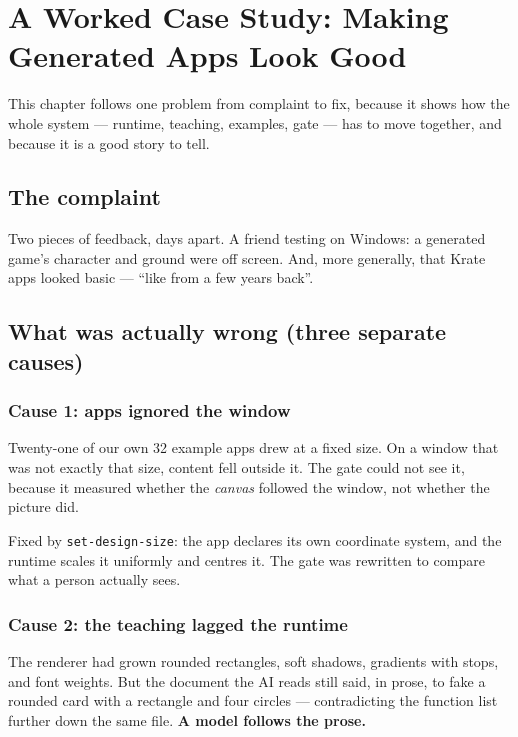\documentclass[11pt,a4paper]{report}
\begin{document}
\chapter{A Worked Case Study: Making Generated Apps Look Good}

This chapter follows one problem from complaint to fix, because it shows
how the whole system --- runtime, teaching, examples, gate --- has to move
together, and because it is a good story to tell.

\section{The complaint}

Two pieces of feedback, days apart. A friend testing on Windows: a
generated game's character and ground were off screen. And, more generally,
that Krate apps looked basic --- ``like from a few years back''.

\section{What was actually wrong (three separate causes)}

\subsection{Cause 1: apps ignored the window}

Twenty-one of our own 32 example apps drew at a fixed size. On a window
that was not exactly that size, content fell outside it. The gate could not
see it, because it measured whether the \emph{canvas} followed the window,
not whether the picture did.

Fixed by \texttt{set-design-size}: the app declares its own coordinate
system, and the runtime scales it uniformly and centres it. The gate was
rewritten to compare what a person actually sees.

\subsection{Cause 2: the teaching lagged the runtime}

The renderer had grown rounded rectangles, soft shadows, gradients with
stops, and font weights. But the document the AI reads still said, in prose,
to fake a rounded card with a rectangle and four circles --- contradicting
the function list further down the same file. \textbf{A model follows the
prose.}
\end{document}
